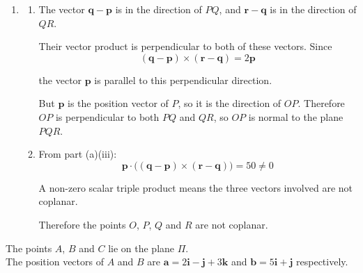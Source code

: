 \documentclass[leqno]{article}
\begin{document}
\begin{enumerate}[
  label=\textbf{\arabic*.},
  leftmargin=*,
  topsep=0pt,
  partopsep=0pt,
  parsep=0pt
]
\begin{djsSolution}
\begin{enumerate}[label=\textbf{(\alph*)}]
\begin{enumerate}[label=(\roman*)]
    So the vector is $\mathbf 0$.

    \item Again using the given result:
    \begin{align*}
    \mathbf p\cdot\big((\mathbf q-\mathbf p)\times(\mathbf r-\mathbf q)\big)
    &=\mathbf p\cdot 2\mathbf p\\
    &=2(\mathbf p\cdot\mathbf p)\\
    &=2\lvert\mathbf p\rvert^2\\
    &=2(5^2)\\
    &=50
    \end{align*}

    So the scalar is $50$.
  \end{enumerate}

  \item
  \begin{enumerate}[label=(\roman*)]
    \item The vector $\mathbf q-\mathbf p$ is in the direction of $PQ$, and $\mathbf r-\mathbf q$ is in the direction of $QR$.

    Their vector product is perpendicular to both of these vectors. Since
    \[
    (\mathbf q-\mathbf p)\times(\mathbf r-\mathbf q)=2\mathbf p
    \]

    the vector $\mathbf p$ is parallel to this perpendicular direction.

    But $\mathbf p$ is the position vector of $P$, so it is the direction of $OP$. Therefore $OP$ is perpendicular to both $PQ$ and $QR$, so $OP$ is normal to the plane $PQR$.

    \item From part (a)(iii):
    \[
    \mathbf p\cdot\big((\mathbf q-\mathbf p)\times(\mathbf r-\mathbf q)\big)=50\neq 0
    \]

    A non-zero scalar triple product means the three vectors involved are not coplanar.

    Therefore the points $O$, $P$, $Q$ and $R$ are not coplanar.
  \end{enumerate}
\end{enumerate}
\end{djsSolution}


\newpage

\questionitem

The points $A$, $B$ and $C$ lie on the plane $\Pi$. \\

The position vectors of $A$ and $B$ are $\mathbf{a}=2\mathbf{i}-\mathbf{j}+3\mathbf{k}$ and $\mathbf{b}=5\mathbf{i}+\mathbf{j}$ respectively. \\


\end{enumerate}
\end{document}

